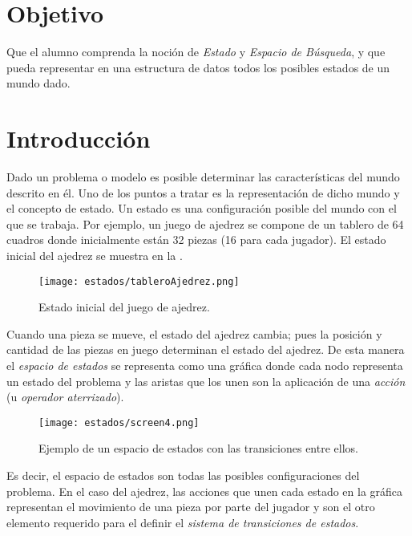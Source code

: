 

\section{Objetivo}
Que el alumno comprenda la noción de \emph{Estado} y \emph{Espacio de Búsqueda}, y que pueda representar en una estructura de datos todos los posibles estados de un mundo dado. \par

\section{Introducci\'on}
Dado un problema o modelo es posible determinar las características del mundo descrito en él. Uno de los puntos a tratar es la representación de dicho mundo y el concepto de estado. Un estado es una configuración posible del mundo con el que se trabaja. Por ejemplo, un juego de ajedrez se compone de un tablero de 64 cuadros donde inicialmente están 32 piezas (16 para cada jugador). El estado inicial del ajedrez se muestra en la .\par

\begin{figure}
  \centering
  \texttt{[image: estados/tableroAjedrez.png]}
  \caption{Estado inicial del juego de ajedrez.}
  \label{fig:ajedrez}
\end{figure}

Cuando una pieza se mueve, el estado del ajedrez cambia; pues la posición y cantidad de las piezas en juego determinan el estado del ajedrez.  De esta manera el \emph{espacio de estados} se representa como una gráfica donde cada nodo representa un estado del problema y las aristas que los unen son la aplicación de una \emph{acción} (u \textit{operador aterrizado}).\par


\begin{figure}
  \centering
  \texttt{[image: estados/screen4.png]}
  \caption{Ejemplo de un espacio de estados con las transiciones entre ellos. \protect\footnotemark }
  \label{fig:espacioestados}
\end{figure}


Es decir, el espacio de estados son todas las posibles configuraciones del problema. En el caso del ajedrez, las acciones que unen cada estado en la gráfica representan el movimiento de una pieza por parte del jugador y son el otro elemento requerido para el definir el \emph{sistema de transiciones de estados}.


